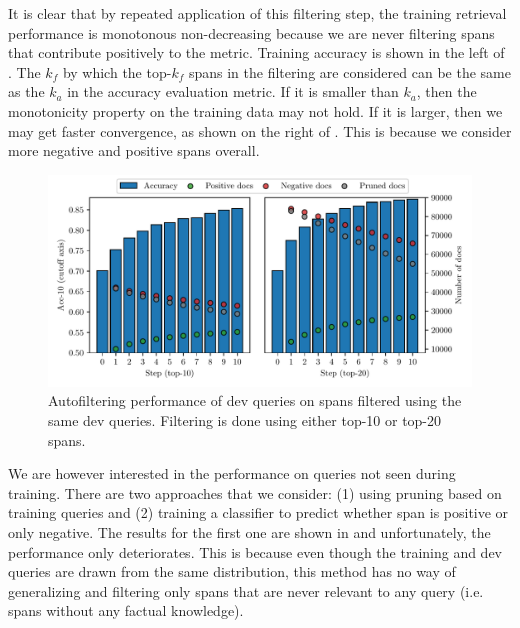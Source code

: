 \clearpage

It is clear that by repeated application of this filtering step, the training retrieval performance is monotonous non-decreasing because we are never filtering spans that contribute positively to the metric.
Training accuracy is shown in the left of .
The $k_f$ by which the top-$k_f$ spans in the filtering are considered can be the same as the $k_a$ in the accuracy evaluation metric.
If it is smaller than $k_a$, then the monotonicity property on the training data may not hold.
If it is larger, then we may get faster convergence, as shown on the right of .
This is because we consider more negative and positive spans overall.

\begin{figure}[ht]
    \center
    \includegraphics[width=\linewidth]{img/autofilter_dev_dev.pdf}
    \caption{Autofiltering performance of dev queries on spans filtered using the same dev queries. Filtering is done using either top-10 or top-20 spans.}
    \label{fig:autofilter_dev_dev}
\end{figure}

We are however interested in the performance on queries not seen during training.
There are two approaches that we consider: (1) using pruning based on training queries and (2) training a classifier to predict whether span is positive or only negative.
The results for the first one are shown in  and unfortunately, the performance only deteriorates.
This is because even though the training and dev queries are drawn from the same distribution, this method has no way of generalizing and filtering only spans that are never relevant to any query (i.e. spans without any factual knowledge).


